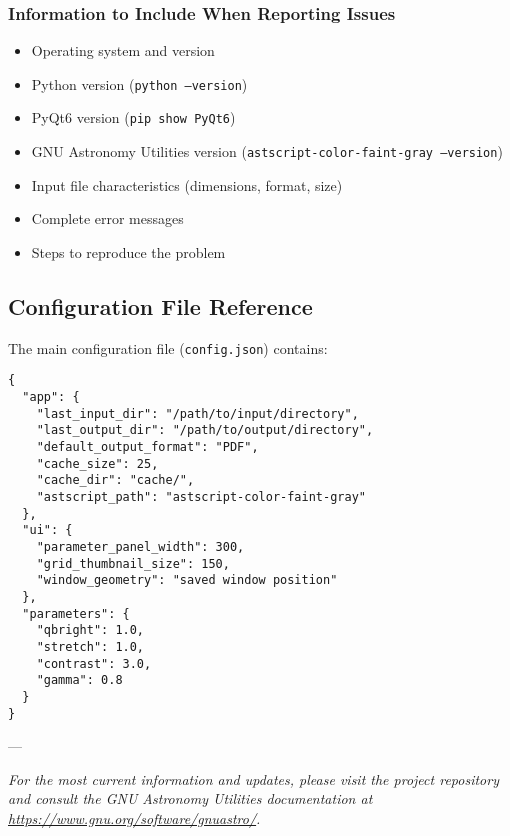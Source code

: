 \documentclass[11pt,a4paper]{article}
\begin{document}
\subsubsection{Information to Include When Reporting Issues}

\begin{itemize}[leftmargin=*]
\item Operating system and version
\item Python version (\texttt{python --version})
\item PyQt6 version (\texttt{pip show PyQt6})
\item GNU Astronomy Utilities version (\texttt{astscript-color-faint-gray
--version})
\item Input file characteristics (dimensions, format, size)
\item Complete error messages
\item Steps to reproduce the problem
\end{itemize}

\subsection{Configuration File Reference}

The main configuration file (\texttt{config.json}) contains:

\begin{lstlisting}
{
  "app": {
    "last_input_dir": "/path/to/input/directory",
    "last_output_dir": "/path/to/output/directory", 
    "default_output_format": "PDF",
    "cache_size": 25,
    "cache_dir": "cache/",
    "astscript_path": "astscript-color-faint-gray"
  },
  "ui": {
    "parameter_panel_width": 300,
    "grid_thumbnail_size": 150,
    "window_geometry": "saved window position"
  },
  "parameters": {
    "qbright": 1.0,
    "stretch": 1.0,
    "contrast": 3.0,
    "gamma": 0.8
  }
}
\end{lstlisting}

---

\textit{For the most current information and updates, please visit the
project repository and consult the GNU Astronomy Utilities documentation at
\url{https://www.gnu.org/software/gnuastro/}.}
\end{document}
